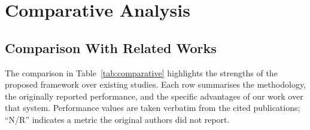 \section{Comparative Analysis}
\label{sec:comparative}

\subsection{Comparison With Related Works}
\label{subsec:comparison-related}

The comparison in Table~\ref{tab:comparative} highlights the strengths of the proposed framework over existing studies. Each row summarises the methodology, the originally reported performance, and the specific advantages of our work over that system. Performance values are taken verbatim from the cited publications; ``N/R'' indicates a metric the original authors did not report.

